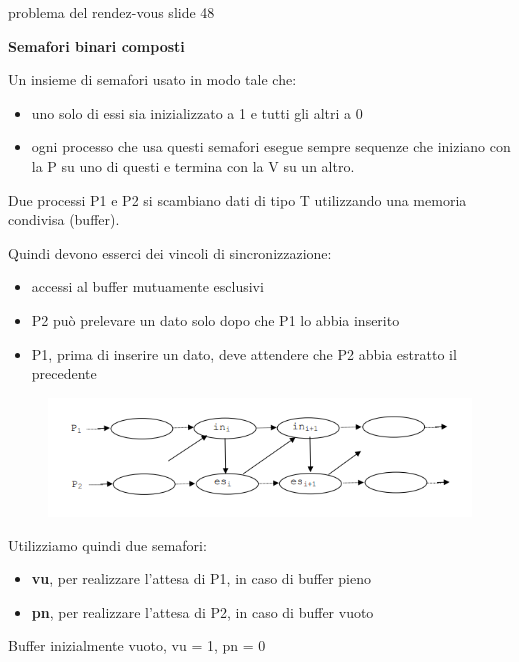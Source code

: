 \documentclass{article}
\begin{document}
{
    problema del rendez-vous slide 48
}

\vspace{5mm}
\textbf{Semafori binari composti}

\vspace{3mm}
Un insieme di semafori usato in modo tale che:
\begin{itemize}
    \item uno solo di essi sia inizializzato a 1 e tutti gli altri a 0
    \item ogni processo che usa questi semafori esegue sempre sequenze che iniziano con la P su uno di questi e termina con la V su un altro.
\end{itemize}

Due processi P1 e P2 si scambiano dati di tipo T utilizzando una memoria condivisa (buffer).

Quindi devono esserci dei vincoli di sincronizzazione:
\begin{itemize}
    \item accessi al buffer mutuamente esclusivi
    \item P2 può prelevare un dato solo dopo che P1 lo abbia inserito
    \item P1, prima di inserire un dato, deve attendere che P2 abbia estratto il precedente
\end{itemize}

\begin{figure}[htbp]
    \centering
    \includegraphics[width=0.60\columnwidth]{imgs/vincoli_precendenza.PNG}
\end{figure}

\vspace{3mm}
Utilizziamo quindi due semafori:
\begin{itemize}
    \item \textbf{vu}, per realizzare l'attesa di P1, in caso di buffer pieno
    \item \textbf{pn}, per realizzare l'attesa di P2, in caso di buffer vuoto
\end{itemize}

\vspace{3mm}
Buffer inizialmente vuoto, vu = 1, pn = 0
\vspace{3mm}
\end{document}
